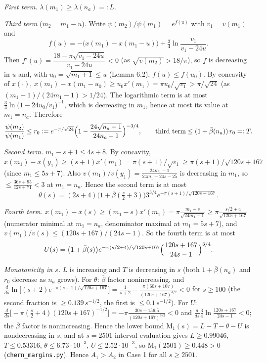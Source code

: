 \emph{First term.} \(\lambda(m_1)\ge\lambda(n_a)=:L\).

\emph{Third term} (\(m_2=m_1-u\)). Write \(\psi(m_2)/\psi(m_1)=e^{f(u)}\) with \(v_1=v(m_1)\) and
\[f(u)=-\bigl(x(m_1)-x(m_1-u)\bigr)+\tfrac34\ln\frac{v_1}{v_1-24u}.\]
Then \(f'(u)=\dfrac{18-\pi\sqrt{v_1-24u}}{v_1-24u}<0\) (as \(\sqrt{v(m_2)}>18/\pi\)), so \(f\) is decreasing in \(u\) and, with \(u_0=\sqrt{m_1+1}\le u\) (Lemma 6.2), \(f(u)\le f(u_0)\). By concavity of \(x(\cdot)\), \(x(m_1)-x(m_1-u_0)\ge u_0x'(m_1)=\pi u_0/\sqrt{v_1}>\pi/\sqrt{24}\) (as \((m_1+1)/(24m_1-1)>1/24\)). The logarithmic term is at most \(\frac34\ln\bigl(1-24u_0/v_1\bigr)^{-1}\), which is decreasing in \(m_1\), hence at most its value at \(m_1=n_a\). Therefore
\[\frac{\psi(m_2)}{\psi(m_1)}\le r_0:=e^{-\pi/\sqrt{24}}\Bigl(1-\frac{24\sqrt{n_a+1}}{24n_a-1}\Bigr)^{-3/4},\qquad\text{third term}\le(1+\bar\beta(n_a))\,r_0=:T .\]

\emph{Second term.} \(m_1-s+1\le4s+8\). By concavity, \(x(m_1)-x(y_1)\ge(s+1)x'(m_1)=\pi(s+1)/\sqrt{v_1}\ge\pi(s+1)/\sqrt{120s+167}\) (since \(m_1\le5s+7\)). Also \(v(m_1)/v(y_1)=\frac{24m_1-1}{24m_1-24s-25}\) is decreasing in \(m_1\), so \(\le\frac{36s+95}{12s+71}<3\) at \(m_1=n_a\). Hence the second term is at most
\[\theta(s)=(2s+4)\bigl(1+\bar\beta(\tfrac s2+3)\bigr)3^{3/4}e^{-\pi(s+1)/\sqrt{120s+167}} .\]

\emph{Fourth term.} \(x(m_1)-x(s)\ge(m_1-s)x'(m_1)=\pi\frac{m_1-s}{\sqrt{24m_1-1}}\ge\pi\frac{s/2+4}{\sqrt{120s+167}}\) (numerator minimal at \(m_1=n_a\), denominator maximal at \(m_1=5s+7\)), and \(v(m_1)/v(s)\le(120s+167)/(24s-1)\). So the fourth term is at most
\[U(s)=\bigl(1+\bar\beta(s)\bigr)e^{-\pi(s/2+4)/\sqrt{120s+167}}\Bigl(\frac{120s+167}{24s-1}\Bigr)^{3/4}.\]

\emph{Monotonicity in \(s\).} \(L\) is increasing and \(T\) is decreasing in \(s\) (both \(1+\bar\beta(n_a)\) and \(r_0\) decrease as \(n_a\) grows). For \(\theta\): \(\bar\beta\) factor nonincreasing, and \(\frac d{ds}\ln\bigl[(s+2)e^{-\pi(s+1)/\sqrt{120s+167}}\bigr]=\frac1{s+2}-\frac{\pi(60s+107)}{(120s+167)^{3/2}}<0\) for \(s\ge100\) (the second fraction is \(\ge0.139\,s^{-1/2}\), the first is \(\le0.1\,s^{-1/2}\)). For \(U\): \(\frac d{ds}\bigl[-\pi(\tfrac s2+4)(120s+167)^{-1/2}\bigr]=-\pi\frac{30s-156.5}{(120s+167)^{3/2}}<0\) and \(\frac{d}{ds}\frac34\ln\frac{120s+167}{24s-1}<0\); the \(\bar\beta\) factor is nonincreasing. Hence the lower bound \(\mathrm{M}_1(s)=L-T-\theta-U\) is nondecreasing in \(s\), and at \(s=2501\) interval evaluation gives \(L\ge0.99046\), \(T\le0.53316\), \(\theta\le6.73\cdot10^{-3}\), \(U\le2.52\cdot10^{-3}\), so \(\mathrm M_1(2501)\ge0.448>0\) (\texttt{chern\_margins.py}). Hence \(A_1>A_2\) in Case 1 for all \(s\ge2501\).

